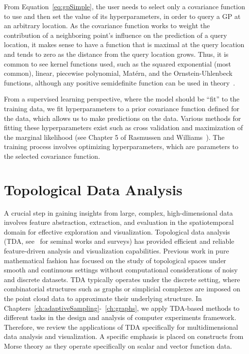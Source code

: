 From Equation~\ref{eq:gpSimple}, the user needs to select only a covariance function to use and then set the value of its hyperparameters, in order to query a GP at an arbitrary location.
%
As the covariance function works to weight the contribution of a neighboring point's influence on the prediction of a query location, it makes sense to have a function that is maximal at the query location and tends to zero as the distance from the query location grows.
%
Thus, it is common to see kernel functions used, such as the squared exponential (most common), linear, piecewise polynomial, Mat\'{e}rn, and the Ornstein-Uhlenbeck functions, although any positive semidefinite function can be used in theory~\cite{RasmussenWilliams2006}.

From a supervised learning perspective, where the model should be ``fit'' to the training data, we fit hyperparameters to a prior covariance function defined for the data, which allows us to make predictions on the data.
%
Various methods for fitting these hyperparameters exist such as cross validation and maximization of the marginal likelihood (see Chapter 5 of Rasmussen and Williams~\cite{RasmussenWilliams2006}).
%
The training process involves optimizing hyperparameters, which are parameters to the selected covariance function.

\section{Topological Data Analysis}
A crucial step in gaining insights from large, complex, high-dimensional data involves feature abstraction, extraction, and evaluation in the spatiotemporal domain for effective exploration and visualization.
%
Topological data analysis (TDA, see~\cite{EdsbrunnerHarer2010,Zomorodian2005,BiasottisDeFlorianiFalcidieno2008,Carlsson2009,EdelsbrunnerHarer2008,Ghrist2009} for seminal works and surveys) has provided efficient and reliable feature-driven analysis and visualization capabilities.
%
Previous work in pure mathematical fashion has focused on the study of topological spaces under smooth and continuous settings without computational considerations of noisy and discrete datasets.
%
TDA typically operates under the discrete setting, where combinatorial structures such as graphs or simplicial complexes are imposed on the point cloud data to approximate their underlying structure.
%
In Chapters~\ref{ch:adaptiveSampling}-~\ref{ch:graphs}, we apply TDA-based methods to different tasks in the design and analysis of computer experiments framework.
%
Therefore, we review the applications of TDA specifically for multidimensional data analysis and visualization.
%
A specific emphasis is placed on constructs from Morse theory as they operate specifically on scalar and vector function data.

